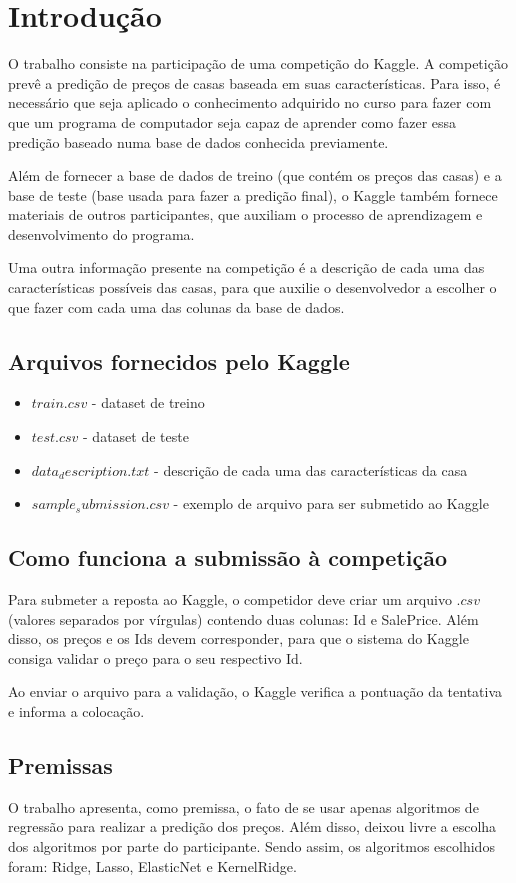 \section{Introdução}

O trabalho consiste na participação de uma competição do Kaggle. A competição prevê a predição de preços de casas baseada em suas características. Para isso, é necessário que seja aplicado o conhecimento adquirido no curso para fazer com que um programa de computador seja capaz de aprender como fazer essa predição baseado numa base de dados conhecida previamente.

Além de fornecer a base de dados de treino (que contém os preços das casas) e a base de teste (base usada para fazer a predição final), o Kaggle também fornece materiais de outros participantes, que auxiliam o processo de aprendizagem e desenvolvimento do programa.

Uma outra informação presente na competição é a descrição de cada uma das características possíveis das casas, para que auxilie o desenvolvedor a escolher o que fazer com cada uma das colunas da base de dados.

\subsection{Arquivos fornecidos pelo Kaggle}

\begin{itemize}
\item \textbf{$train.csv$} - dataset de treino
\item \textbf{$test.csv$} - dataset de teste
\item \textbf{$data_description.txt$} - descrição de cada uma das características da casa
\item \textbf{$sample_submission.csv$} - exemplo de arquivo para ser submetido ao Kaggle
\end{itemize}

\subsection{Como funciona a submissão à competição}

Para submeter a reposta ao Kaggle, o competidor deve criar um arquivo $ .csv $ (valores separados por vírgulas) contendo duas colunas: Id e SalePrice. Além disso, os preços e os Ids devem corresponder, para que o sistema do Kaggle consiga validar o preço para o seu respectivo Id.

Ao enviar o arquivo para a validação, o Kaggle verifica a pontuação da tentativa e informa a colocação.

\subsection{Premissas}

O trabalho apresenta, como premissa, o fato de se usar apenas algoritmos de regressão para realizar a predição dos preços. Além disso, deixou livre a escolha dos algoritmos por parte do participante. Sendo assim, os algoritmos escolhidos foram: Ridge, Lasso, ElasticNet e KernelRidge.

\clearpage